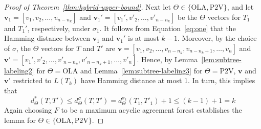 \documentclass{article}
\newcommand{\OLA}{\mathrm{OLA}}
\newcommand{\PV}{\mathrm{P2V}}
\begin{document}
\begin{proof}[Proof of Theorem~\ref{thm:hybrid-upper-bound}]
Next let $\Theta\in\{\OLA,\PV\}$, and let $\mathbf{v}_1=[v_1,v_2,\ldots, v_{n-n_k}]$ and $\mathbf{v}_1'=[v_1',v'_2,\ldots, v'_{n-n_k}]$ be the $\Theta$ vectors for $T_1$ and $T_1'$, respectively, under $\sigma_1$. It follows from Equation~\eqref{eq:one} that the Hamming distance between $\mathbf{v}_1$ and $\mathbf{v}_1'$ is at most $k-1$. Moreover, by the choice of $\sigma$, the $\Theta$ vectors for $T$ and $T'$ are  $\mathbf{v}=[v_1,v_2,\ldots, v_{n-n_k},v_{n-n_k+1},\ldots,v_n]$ and $\mathbf{v}'=[v_1',v'_2,\ldots, v'_{n-n_k},v'_{n-n_k+1},\ldots,v'_n]$. Hence, by Lemma~\ref{lem:subtree-labeling2} for $\Theta=\OLA$ and Lemma~\ref{lem:subtree-labeling3} for $\Theta=\PV$, $\mathbf{v}$ and $\mathbf{v}'$ restricted to $L(T_k)$ have Hamming distance at most 1. In turn, this implies that 
$$d^*_\Theta(T, T')\leq d^{\sigma}_{\Theta}(T, T')  =d^{\sigma_1}_{\Theta}(T_1, T'_1) + 1 \le (k-1) + 1 = k$$
Again choosing $F$ to be a maximum acyclic agreement forest establishes the lemma for $\Theta\in\{\OLA,\PV\}$.
\end{proof}
\end{document}
